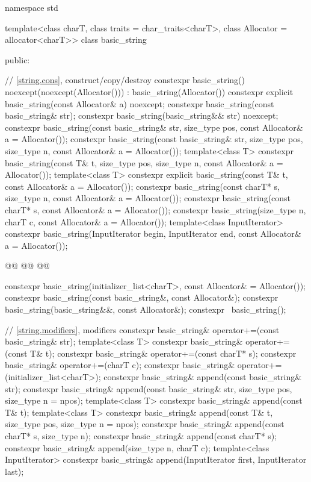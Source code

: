 \documentclass{wg21}
\begin{document}
\begin{codeblock}
namespace std {
    template<class charT, class traits = char_traits<charT>, class Allocator = allocator<charT>>
    class basic_string {
        public:
        
        // \ref{string.cons}, construct/copy/destroy
        constexpr basic_string() noexcept(noexcept(Allocator())) : basic_string(Allocator()) { }
        constexpr explicit basic_string(const Allocator& a) noexcept;
        constexpr basic_string(const basic_string& str);
        constexpr basic_string(basic_string&& str) noexcept;
        constexpr basic_string(const basic_string& str, size_type pos,
        const Allocator& a = Allocator());
        constexpr basic_string(const basic_string& str, size_type pos, size_type n,
        const Allocator& a = Allocator());
        template<class T>
        constexpr basic_string(const T& t, size_type pos, size_type n,
        const Allocator& a = Allocator());
        template<class T>
        constexpr explicit basic_string(const T& t, const Allocator& a = Allocator());
        constexpr basic_string(const charT* s, size_type n, const Allocator& a = Allocator());
        constexpr basic_string(const charT* s, const Allocator& a = Allocator());
        constexpr basic_string(size_type n, charT c, const Allocator& a = Allocator());
        template<class InputIterator>
        constexpr basic_string(InputIterator begin, InputIterator end, const Allocator& a = Allocator());
        
        @@
        @@
        @@
        
        constexpr basic_string(initializer_list<charT>, const Allocator& = Allocator());
        constexpr basic_string(const basic_string&, const Allocator&);
        constexpr basic_string(basic_string&&, const Allocator&);
        constexpr ~basic_string();
        
        // \ref{string.modifiers}, modifiers
        constexpr basic_string& operator+=(const basic_string& str);
        template<class T>
        constexpr basic_string& operator+=(const T& t);
        constexpr basic_string& operator+=(const charT* s);
        constexpr basic_string& operator+=(charT c);
        constexpr basic_string& operator+=(initializer_list<charT>);
        constexpr basic_string& append(const basic_string& str);
        constexpr basic_string& append(const basic_string& str, size_type pos, size_type n = npos);
        template<class T>
        constexpr basic_string& append(const T& t);
        template<class T>
        constexpr basic_string& append(const T& t, size_type pos, size_type n = npos);
        constexpr basic_string& append(const charT* s, size_type n);
        constexpr basic_string& append(const charT* s);
        constexpr basic_string& append(size_type n, charT c);
        template<class InputIterator>
        constexpr basic_string& append(InputIterator first, InputIterator last);
        
}}
\end{codeblock}
\end{document}
